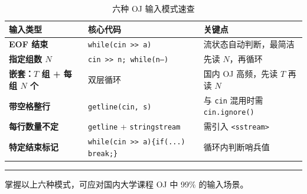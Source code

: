 \documentclass[12pt, a4paper]{article}
\begin{document}
\begin{table}[h!]
\centering
\renewcommand{\arraystretch}{1.4}
\begin{tabularx}{\textwidth}{
  >{\bfseries}l
  l
  X
}
\toprule
输入类型 & 核心代码 & 关键点 \\
\midrule
EOF 结束
  & \texttt{while(cin >> a)}
  & 流状态自动判断，最简洁 \\

指定组数 $N$
  & \texttt{cin >> n; while(n--)}
  & 先读 $N$，再循环 \\

嵌套：$T$ 组 + 每组 $N$ 个
  & 双层循环
  & 国内 OJ 高频，先读 $T$ 再读 $N$ \\

带空格整行
  & \texttt{getline(cin, s)}
  & 与 \texttt{cin} 混用时需 \texttt{cin.ignore()} \\

每行数量不定
  & \texttt{getline} + \texttt{stringstream}
  & 需引入 \texttt{<sstream>} \\

特定结束标记
  & \texttt{while(cin >> a)\{if(...) break;\}}
  & 循环内判断哨兵值 \\
\bottomrule
\end{tabularx}
\caption{六种 OJ 输入模式速查}
\end{table}

\vspace{1em}
\noindent\rule{\linewidth}{0.4pt}
\begin{center}
{\small 掌握以上六种模式，可应对国内大学课程 OJ 中 99\% 的输入场景。}
\end{center}
\end{document}
